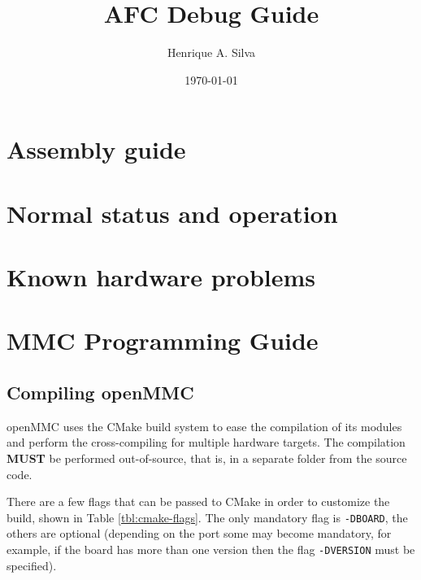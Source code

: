 \documentclass[letterpaper,12pt, titlepage]{article}
\begin{document}
\title{\bfseries \huge AFC Debug Guide}
\author{Henrique A. Silva}
\date{\today}
\maketitle

\tableofcontents
\newpage

\section{Assembly guide}

\section{Normal status and operation}

\section{Known hardware problems}

\section{MMC Programming Guide}

\subsection{Compiling openMMC}
openMMC \cite{openmmc-github} uses the CMake build system to ease the compilation of its modules and perform the cross-compiling for multiple hardware targets.
The compilation \textbf{MUST} be performed out-of-source, that is, in a separate folder from the source code.

There are a few flags that can be passed to CMake in order to customize the build, shown in Table \ref{tbl:cmake-flags}. The only mandatory flag is \texttt{-DBOARD}, the others are optional (depending on the port some may become mandatory, for example, if the board has more than one version then the flag \texttt{-DVERSION} must be specified).
\end{document}

